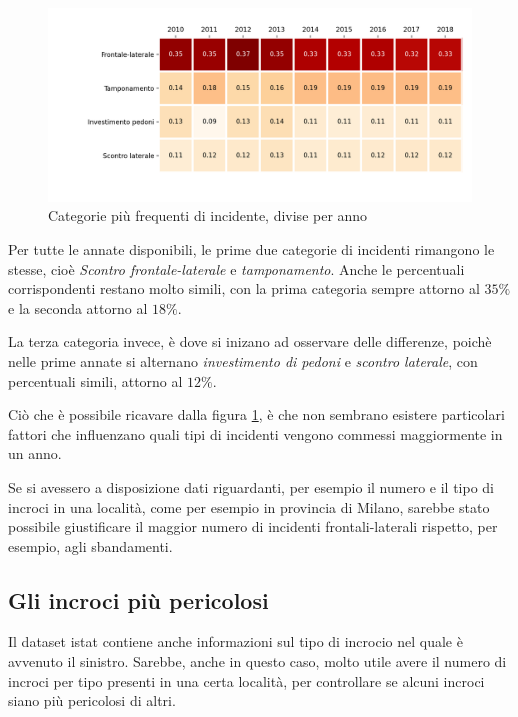\documentclass[a4paper]{report}
\begin{document}
\begin{figure}
    \includegraphics[width=\linewidth]{../src/incidenti/incidenti_senza_coords/localizzazione_incidente/rapporto_tipologie.png}
    \caption{Categorie più frequenti di incidente, divise per anno}
    \label{fig:rapporto-tipologie}
\end{figure}

Per tutte le annate disponibili, le prime due categorie di incidenti rimangono le stesse, cioè 
\textit{Scontro frontale-laterale} e \textit{tamponamento}. Anche le percentuali 
corrispondenti restano molto simili, con la prima categoria sempre attorno al $35\%$ e 
la seconda attorno al $18\%$.

La terza categoria invece, è dove si inizano ad osservare delle differenze, poichè nelle 
prime annate si alternano \textit{investimento di pedoni} e \textit{scontro laterale}, 
con percentuali simili, attorno al $12\%$.

Ciò che è possibile ricavare dalla figura \ref{fig:rapporto-tipologie}, è che non 
sembrano esistere particolari fattori che influenzano quali tipi di incidenti vengono 
commessi maggiormente in un anno. 

Se si avessero a disposizione dati riguardanti, per esempio il numero e il tipo 
di incroci in una località, come per esempio in provincia di Milano, sarebbe stato possibile 
giustificare il maggior numero di incidenti frontali-laterali rispetto, per esempio, agli sbandamenti.

\subsection{Gli incroci più pericolosi}

Il dataset istat contiene anche informazioni sul tipo di incrocio nel quale è avvenuto il 
sinistro.
Sarebbe, anche in questo caso, molto utile avere il numero di incroci per tipo presenti in una certa 
località, per controllare se alcuni incroci siano più pericolosi di altri.
\end{document}

